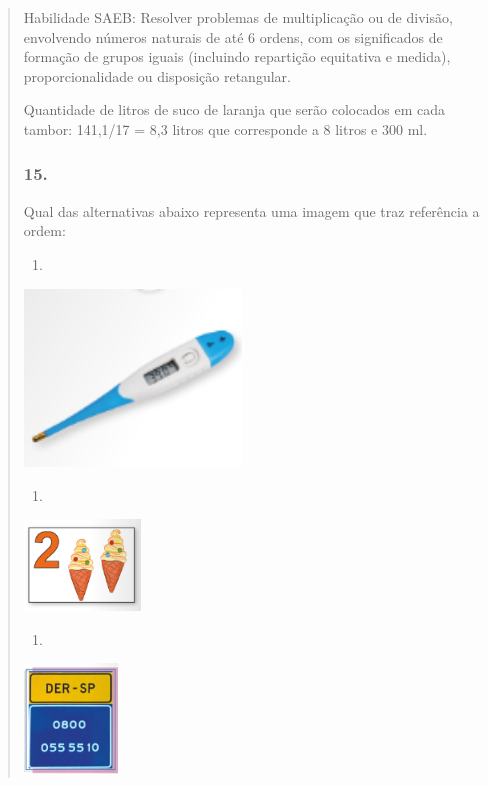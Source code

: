 \begin{enumerate}
\begin{escolha}
\begin{enumerate}
\begin{itemize}
\begin{itemize}
\begin{escolha}
\begin{quote}
\begin{escolha}
{Habilidade SAEB: Resolver problemas de multiplicação ou de divisão,
envolvendo números naturais de até 6 ordens, com os significados de
formação de grupos iguais (incluindo repartição equitativa e medida),
proporcionalidade ou disposição retangular.

Quantidade de litros de suco de laranja que serão colocados em cada
tambor: 141,1/17 = 8,3 litros que corresponde a 8 litros e 300 ml.

\subsubsection{15.}\label{section-156}

Qual das alternativas abaixo representa uma imagem que traz referência a
ordem:

\begin{enumerate}
\def\labelenumi{\alph{enumi})}
\item
\end{enumerate}

\includegraphics[width=2.27516in,height=1.85833in]{media/image148.png}

\begin{enumerate}
\def\labelenumi{\alph{enumi})}
\item
\end{enumerate}

\includegraphics[width=1.21677in,height=0.95842in]{media/image149.png}

\begin{enumerate}
\def\labelenumi{\alph{enumi})}
\item
\end{enumerate}

\includegraphics[width=0.98342in,height=1.15010in]{media/image150.png}

}
\end{escolha}
\end{quote}
\end{escolha}
\end{itemize}
\end{itemize}
\end{enumerate}
\end{escolha}
\end{enumerate}
